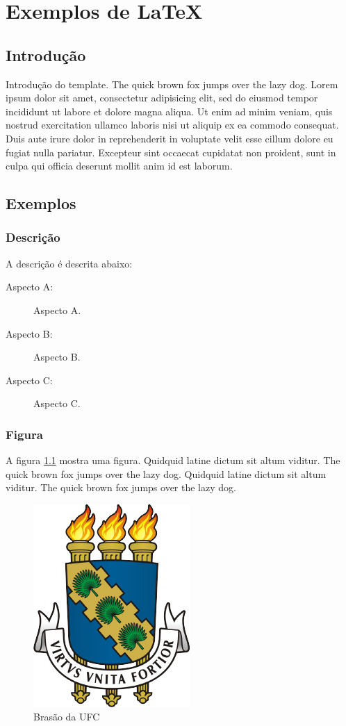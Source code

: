 \chapter{Exemplos de \LaTeX}


\section{Introdução}

Introdução do template. The quick brown fox jumps over the lazy dog. Lorem
ipsum dolor sit amet, consectetur adipisicing elit, sed do eiusmod tempor
incididunt ut labore et dolore magna aliqua. Ut enim ad minim veniam, quis
nostrud exercitation ullamco laboris nisi ut aliquip ex ea commodo consequat.
Duis aute irure dolor in reprehenderit in voluptate velit esse cillum dolore eu
fugiat nulla pariatur. Excepteur sint occaecat cupidatat non proident, sunt in
culpa qui officia deserunt mollit anim id est laborum.


\section{Exemplos}


\subsection{Descrição}

A descrição é descrita abaixo:

\begin{description}
\item[Aspecto A:] Aspecto A.
\item[Aspecto B:] Aspecto B.
\item[Aspecto C:] Aspecto C.
\end{description}


\subsection{Figura}

A figura \ref{fig:graph} mostra uma figura. Quidquid latine dictum sit altum
viditur. The quick brown fox jumps over the lazy dog. Quidquid latine dictum
sit altum viditur. The quick brown fox jumps over the lazy dog.

\begin{figure}[htbp]
\centering
\includegraphics[width=.30\textwidth]{fig/UFC}
\caption{Brasão da UFC}
\label{fig:graph}
\end{figure}


